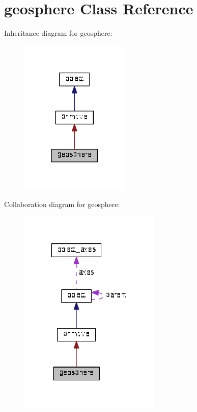 \hypertarget{classgeosphere}{}\section{geosphere Class Reference}
\label{classgeosphere}


Inheritance diagram for geosphere\+:\nopagebreak
\begin{figure}[H]
\begin{center}
\leavevmode
\includegraphics[width=148pt]{classgeosphere__inherit__graph}
\end{center}
\end{figure}


Collaboration diagram for geosphere\+:\nopagebreak
\begin{figure}[H]
\begin{center}
\leavevmode
\includegraphics[width=191pt]{classgeosphere__coll__graph}
\end{center}
\end{figure}
